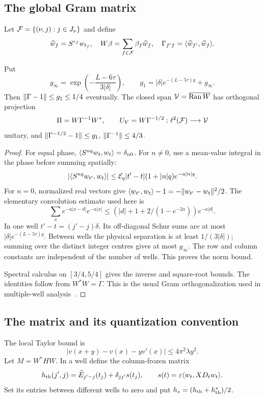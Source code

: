 \subsection{The global Gram matrix}
Let $\mathcal F=\{(\nu,j):j\in J_\nu\}$ and define
\[
 \widehat w_f=S^{c_f}w_{t_f},\quad
 W\beta=\sum_{f\in\mathcal F}\beta_f\widehat w_f,
 \quad \Gamma_{f'f}=\langle \widehat w_{f'},\widehat w_f\rangle.
\]

\begin{lemma}\label{lem:Gram}
Put
\[
 g_\infty=\exp\left(-\frac{L-6\tau}{3|\delta|}\right),\qquad
 g_1=|\delta|e^{-(L-5\tau)q}+g_\infty.
\]
Then $\lVert \Gamma-1\rVert\le g_1\le1/4$ eventually. The closed span $\mathcal V=\overline{\operatorname{Ran} W}$ has orthogonal projection
\[
 \Pi=W\Gamma^{-1}W^*,\qquad
 U_V=W\Gamma^{-1/2}:\ell^2(\mathcal F)\longrightarrow\mathcal V
\]
unitary, and $\lVert \Gamma^{-1/2}-1\rVert\le g_1$, $\lVert \Gamma^{-1}\rVert\le4/3$.
\end{lemma}
\begin{proof}
For equal phase, $\langle S^{nq}w_t,w_t\rangle=\delta_{n0}$. For $n\ne0$, use a mean-value integral in the phase before summing spatially:
\[
 |\langle S^{nq}w_{t'},w_t\rangle|
 \le\mathcal E_q|t'-t|(1+|n|q)e^{-a|n|q}.
\]
For $n=0$, normalized real vectors give
$\langle w_{t'},w_t\rangle-1=-\lVert w_{t'}-w_t\rVert^2/2$.
The elementary convolution estimate used here is
\[
 \sum_x e^{-a|x-d|}e^{-a|x|}
 \le(|d|+1+2/(1-e^{-2a}))e^{-a|d|}.
\]
In one well $t'-t=(j'-j)\delta$. Its off-diagonal Schur sums are at most $|\delta|e^{-(L-5\tau)q}$. Between wells the physical separation is at least $1/(3|\delta|)$; summing over the distinct integer centres gives at most $g_\infty$. The row and column constants are independent of the number of wells. This proves the norm bound.

Spectral calculus on $[3/4,5/4]$ gives the inverse and square-root bounds. The identities follow from $W^*W=\Gamma$. This is the usual Gram orthogonalization used in multiple-well analysis~\cite{HSwells}.
\end{proof}

\subsection{The matrix and its quantization convention}
The local Taylor bound is
\begin{equation}\label{eq:Taylor}
 |v(x+y)-v(x)-yv'(x)|\le4\pi^2\lambda y^2.
\end{equation}
Let $M=W^*HW$. In a well define the column-frozen matrix
\[
 h_{\rm tb}(j',j)=\widehat E_{j'-j}(t_j)
                  +\delta_{jj'}s(t_j),
 \qquad s(t)=\varepsilon\langle w_t,XD_tw_t\rangle.
\]
Set its entries between different wells to zero and put $h_s=(h_{\rm tb}+h_{\rm tb}^*)/2$.

